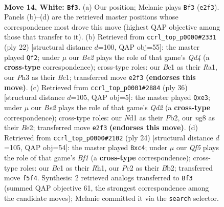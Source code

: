 \documentclass[11pt]{article}
\begin{document}
\clearpage

\begin{figure}[p]\centering
\begin{subfigure}{0.46\textwidth}\centering
\resizebox{\linewidth}{!}{%
\newchessgame
\chessboard[
  setfen={rn2kbnr/4q1p1/2p5/pp1p1QPp/3P4/7P/PPP1BP2/R1BN1RK1 w kq - 0 14},
  showmover=false,
  pgfstyle=straightmove, color=movearrow, markmove={e2-f3}
]}
\caption{}
\end{subfigure}\hfill
\begin{subfigure}{0.46\textwidth}\centering
\resizebox{\linewidth}{!}{%
\newchessgame
\chessboard[
  setfen={r1b1k2r/1pqnbppp/p3p3/3pP3/3Q1P2/2N5/PPP1B1PP/R1B2R1K w kq - 1 12},
  showmover=false,
  pgfstyle=straightmove, color=movearrow, markmove={d4-f2}
]}
\caption{}
\end{subfigure}
\\[4pt]
\begin{subfigure}{0.46\textwidth}\centering
\resizebox{\linewidth}{!}{%
\newchessgame
\chessboard[
  setfen={r2qr1k1/3n1p1n/pp1p2p1/3Pp2p/PN6/4bP2/1PPQB1PP/R4R1K w - - 0 19},
  showmover=false,
  pgfstyle=straightmove, color=movearrow, markmove={d2-e3}
]}
\caption{}
\end{subfigure}\hfill
\begin{subfigure}{0.46\textwidth}\centering
\resizebox{\linewidth}{!}{%
\newchessgame
\chessboard[
  setfen={rn2k2r/1pqbnppp/p3p3/4P3/1PpQ4/P4N2/1B3PPP/R3KB1R w KQkq - 0 13},
  showmover=false,
  pgfstyle=straightmove, color=movearrow, markmove={f1-c4}
]}
\caption{}
\end{subfigure}
\caption{\textbf{Move 14, White: \texttt{Bf3}.} (a) Our position; Melanie plays \texttt{Bf3} (\texttt{e2f3}). Panels (b)--(d) are the retrieved master positions whose correspondence most drove this move (highest QAP objective among those that transfer to it). (b) Retrieved from \texttt{ccrl\_top\_p0000\#2331} (ply 22) [structural distance $d$=100, QAP obj=55]: the master played \texttt{Qf2}; under $\mu$ our \emph{Be2} plays the role of that game's \emph{Qd4} (a \textbf{cross-type} correspondence); cross-type roles: our \emph{B}c1 as their \emph{R}a1, our \emph{P}h3 as their \emph{B}c1; transferred move \texttt{e2f3} \textbf{(endorses this move)}. (c) Retrieved from \texttt{ccrl\_top\_p0001\#2884} (ply 36) [structural distance $d$=105, QAP obj=5]: the master played \texttt{Qxe3}; under $\mu$ our \emph{Be2} plays the role of that game's \emph{Qd2} (a \textbf{cross-type} correspondence); cross-type roles: our \emph{N}d1 as their \emph{P}b2, our \emph{n}g8 as their \emph{B}e2; transferred move \texttt{e2f3} \textbf{(endorses this move)}. (d) Retrieved from \texttt{ccrl\_top\_p0000\#2102} (ply 24) [structural distance $d$=105, QAP obj=54]: the master played \texttt{Bxc4}; under $\mu$ our \emph{Qf5} plays the role of that game's \emph{Bf1} (a \textbf{cross-type} correspondence); cross-type roles: our \emph{B}c1 as their \emph{R}h1, our \emph{P}c2 as their \emph{B}b2; transferred move \texttt{f5f4}. Synthesis: 2 retrieved analogs transferred to \texttt{Bf3} (summed QAP objective 61, the strongest correspondence among the candidate moves); Melanie committed it via the \texttt{search} selector.}
\label{fig:thought-m26}
\end{figure}
\end{document}
